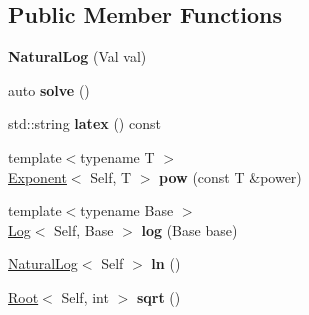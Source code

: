 \subsection*{\-Public \-Member \-Functions}
\begin{DoxyCompactItemize}
\item 
\hypertarget{classlatex_1_1math_1_1NaturalLog_aeeb12e56e32d76ced7fbd41e82941d0f}{{\bfseries \-Natural\-Log} (\-Val val)}\label{classlatex_1_1math_1_1NaturalLog_aeeb12e56e32d76ced7fbd41e82941d0f}

\item 
\hypertarget{classlatex_1_1math_1_1NaturalLog_ad4ffac52939e962b891122008b323abf}{auto {\bfseries solve} ()}\label{classlatex_1_1math_1_1NaturalLog_ad4ffac52939e962b891122008b323abf}

\item 
\hypertarget{classlatex_1_1math_1_1NaturalLog_af75e70ab4e10082741e89127ead0a32b}{std\-::string {\bfseries latex} () const }\label{classlatex_1_1math_1_1NaturalLog_af75e70ab4e10082741e89127ead0a32b}

\item 
\hypertarget{classlatex_1_1math_1_1NaturalLog_a94d5f44f2bb1000ae0a969cccc781bb4}{{\footnotesize template$<$typename T $>$ }\\\hyperlink{classlatex_1_1math_1_1Exponent}{\-Exponent}$<$ \-Self, \-T $>$ {\bfseries pow} (const \-T \&power)}\label{classlatex_1_1math_1_1NaturalLog_a94d5f44f2bb1000ae0a969cccc781bb4}

\item 
\hypertarget{classlatex_1_1math_1_1NaturalLog_abea6ea1be29c3e5bbbabbcf758a79fbf}{{\footnotesize template$<$typename Base $>$ }\\\hyperlink{classlatex_1_1math_1_1Log}{\-Log}$<$ \-Self, \-Base $>$ {\bfseries log} (\-Base base)}\label{classlatex_1_1math_1_1NaturalLog_abea6ea1be29c3e5bbbabbcf758a79fbf}

\item 
\hypertarget{classlatex_1_1math_1_1NaturalLog_ae8720764dd2a28eae1133eb7d5e584b8}{\hyperlink{classlatex_1_1math_1_1NaturalLog}{\-Natural\-Log}$<$ \-Self $>$ {\bfseries ln} ()}\label{classlatex_1_1math_1_1NaturalLog_ae8720764dd2a28eae1133eb7d5e584b8}

\item 
\hypertarget{classlatex_1_1math_1_1NaturalLog_aa73f79ce7b2acb561a8bc190d585c7a8}{\hyperlink{classlatex_1_1math_1_1Root}{\-Root}$<$ \-Self, int $>$ {\bfseries sqrt} ()}\label{classlatex_1_1math_1_1NaturalLog_aa73f79ce7b2acb561a8bc190d585c7a8}

\end{DoxyCompactItemize}
